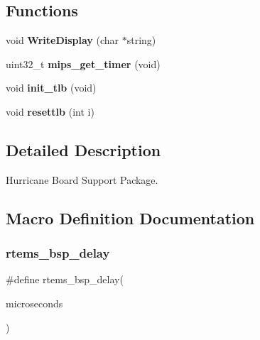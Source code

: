 \subsection*{Functions}
\begin{DoxyCompactItemize}
\item 
\mbox{\label{group__RTEMSBSPsMIPSHurricane_ga8d5c755ff7781b60e1ef2dfa71d69bb3}} 
void {\bfseries Write\+Display} (char $\ast$string)
\item 
\mbox{\label{group__RTEMSBSPsMIPSHurricane_ga44f7c4ebac5e404790b75c05bd039ad8}} 
uint32\+\_\+t {\bfseries mips\+\_\+get\+\_\+timer} (void)
\item 
\mbox{\label{group__RTEMSBSPsMIPSHurricane_gacb3eb371c98c83f4058d92f3e0bb74a8}} 
void {\bfseries init\+\_\+tlb} (void)
\item 
\mbox{\label{group__RTEMSBSPsMIPSHurricane_ga5aac3896e936d66009fe668385795a58}} 
void {\bfseries resettlb} (int i)
\end{DoxyCompactItemize}


\subsection{Detailed Description}
Hurricane Board Support Package. 



\subsection{Macro Definition Documentation}
\mbox{\label{group__RTEMSBSPsMIPSHurricane_gaa227a93db3561a86689137fbd6e10101}} 
\subsubsection{\texorpdfstring{rtems\_bsp\_delay}{rtems\_bsp\_delay}}
{\footnotesize\ttfamily \#define rtems\+\_\+bsp\+\_\+delay(\begin{DoxyParamCaption}\item[{}]{microseconds }\end{DoxyParamCaption})}

